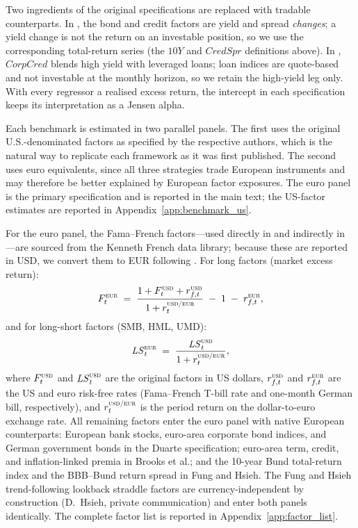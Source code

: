 Two ingredients of the original specifications are replaced with
tradable counterparts. In \citet{fung2004hedge}, the bond and credit
factors are yield and spread \emph{changes}; a yield change is not the
return on an investable position, so we use the corresponding
total-return series (the $\textit{10Y}$ and $\textit{CredSpr}$
definitions above). In \citet{brooks2020active},
$\textit{CorpCred}$ blends high yield with leveraged loans; loan
indices are quote-based and not investable at the monthly horizon, so
we retain the high-yield leg only. With every regressor a realised
excess return, the intercept in each specification keeps its
interpretation as a Jensen alpha.

Each benchmark is estimated in two parallel panels. The first uses the
original U.S.-denominated factors as specified by the respective
authors, which is the natural way to replicate each framework as it
was first published. The second uses euro equivalents, since all three
strategies trade European instruments and may therefore be better
explained by European factor exposures. The euro panel is the primary
specification and is reported in the main text; the US-factor
estimates are reported in Appendix~\ref{app:benchmark_us}.

For the euro panel, the Fama--French factors---used directly in
\citet{duarte2007risk} and indirectly in \citet{fung2004hedge}---are
sourced from the Kenneth French data library; because these are
reported in USD, we convert them to EUR following
\citet{gluck2021currency}. For long factors (market excess return):
\begin{equation}\label{eq:gluck_long}
  F_{t}^{\textsc{eur}}
  \;=\; \frac{1 + F_{t}^{\textsc{usd}} + r_{f,t}^{\textsc{usd}}}
             {1 + r_{t}^{\textsc{usd/eur}}}
        \;-\; 1 \;-\; r_{f,t}^{\textsc{eur}},
\end{equation}
and for long-short factors (SMB, HML, UMD):
\begin{equation}\label{eq:gluck_ls}
  \mathit{LS}_{t}^{\textsc{eur}}
  \;=\; \frac{\mathit{LS}_{t}^{\textsc{usd}}}
             {1 + r_{t}^{\textsc{usd/eur}}},
\end{equation}
where $F_{t}^{\textsc{usd}}$ and $\mathit{LS}_{t}^{\textsc{usd}}$ are
the original factors in US dollars, $r_{f,t}^{\textsc{usd}}$ and
$r_{f,t}^{\textsc{eur}}$ are the US and euro risk-free rates
(Fama--French T-bill rate and one-month German bill, respectively),
and $r_{t}^{\textsc{usd/eur}}$ is the period return on the
dollar-to-euro exchange rate. All remaining factors enter the euro
panel with native European counterparts: European bank stocks,
euro-area corporate bond indices, and German government bonds in the
Duarte specification; euro-area term, credit, and inflation-linked
premia in Brooks et al.; and the 10-year Bund total-return index and
the BBB--Bund return spread in Fung and Hsieh. The Fung and Hsieh
trend-following lookback straddle factors are currency-independent by
construction (D.~Hsieh, private communication) and enter both panels
identically. The complete factor list is reported in
Appendix~\ref{app:factor_list}.

